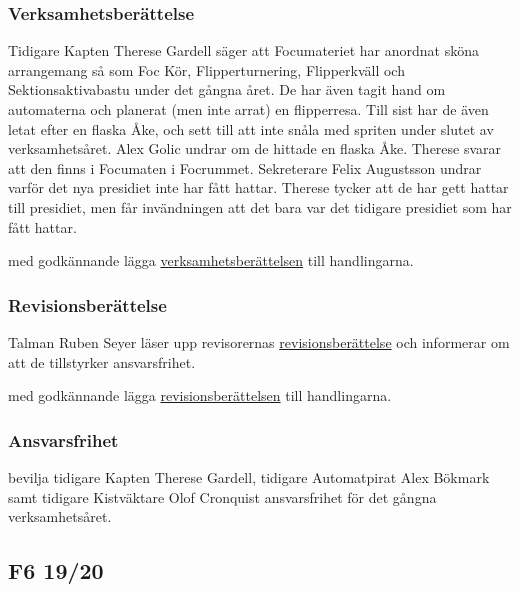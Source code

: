 \documentclass[hidelinks]{sektionsmote}
\begin{document}
\subsubsection{Verksamhetsberättelse}
Tidigare Kapten Therese Gardell säger att Focumateriet har anordnat sköna arrangemang så som Foc Kör, Flipperturnering, Flipperkväll och Sektionsaktivabastu under det gångna året.
De har även tagit hand om automaterna och planerat (men inte arrat) en flipperresa.
Till sist har de även letat efter en flaska Åke, och sett till att inte snåla med spriten under slutet av verksamhetsåret.
Alex Golic undrar om de hittade en flaska Åke.
Therese svarar att den finns i Focumaten i Focrummet.
Sekreterare Felix Augustsson undrar varför det nya presidiet inte har fått hattar.
Therese tycker att de har gett hattar till presidiet, men får invändningen att det bara var det tidigare presidiet som har fått hattar.
\begin{beslut}
    \item med godkännande lägga \hyperlink{bilagor/foc/vb.pdf.1}{verksamhetsberättelsen} till handlingarna.
\end{beslut}

\subsubsection{Revisionsberättelse}
Talman Ruben Seyer läser upp revisorernas \hyperlink{bilagor/foc/rb.pdf.1}{revisionsberättelse} och informerar om att de tillstyrker ansvarsfrihet.
\begin{beslut}
    \item med godkännande lägga \hyperlink{bilagor/foc/rb.pdf.1}{revisionsberättelsen} till handlingarna.
\end{beslut}

\subsubsection{Ansvarsfrihet}
\begin{beslut}
    \item bevilja tidigare Kapten Therese Gardell, tidigare Automatpirat Alex Bökmark samt tidigare Kistväktare Olof Cronquist ansvarsfrihet för det gångna verksamhetsåret.
\end{beslut}

\subsection{F6 19/20}
\end{document}
